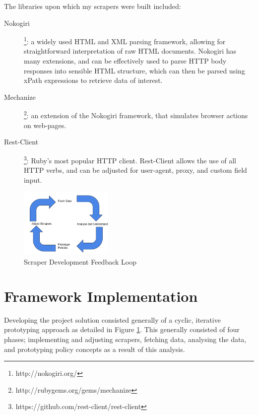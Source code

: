 
The libraries upon which my scrapers were built included:

\begin{description}
 \item [Nokogiri]\footnote{http://nokogiri.org/}: a widely used HTML and XML parsing framework, allowing for straightforward interpretation of raw HTML documents. Nokogiri has many extensions, and can be effectively used to parse HTTP body responses into sensible HTML structure, which can then be parsed using xPath expressions to retrieve data of interest.
 \item [Mechanize]\footnote{http://rubygems.org/gems/mechanize}: an extension of the Nokogiri framework, that simulates browser actions on web-pages. 
 \item [Rest-Client]\footnote{https://github.com/rest-client/rest-client}: Ruby's most popular HTTP client. Rest-Client allows the use of all HTTP verbs, and can be adjusted for user-agent, proxy, and custom field input.
\end{description}

\begin{figure}[h!]
\centering
\includegraphics[width=0.4\textwidth]{Images/Implementation_Lifecycle.pdf}
\caption{Scraper Development Feedback Loop}
\label{fig:dev_cycle}
\end{figure}

\section{Framework Implementation}

Developing the project solution consisted generally of a cyclic, iterative prototyping approach as detailed in Figure \ref{fig:dev_cycle}. This generally consisted of four phases; implementing and adjusting scrapers, fetching data, analysing the data, and prototyping policy concepts as a result of this analysis. 

